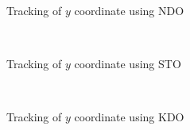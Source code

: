 \documentclass[letterpaper%
, twoside%
, 12pt%
,memoire%
, english%
,creativecommons,hyperref%
]{thETS}
\theoremstyle{newThmStyle}
\begin{document}
\begin{figure}[H]
\centering
{}
\\ \parbox{0.75\textwidth}{\caption{Tracking of $y$ coordinate using NDO}\label{y_trac_dis_m1_ndo}}
\end{figure}

\begin{figure}[H]
\centering
{}
\\ \parbox{0.75\textwidth}{\caption{Tracking of $y$ coordinate using STO}\label{y_trac_dis_m1_sto}}
\end{figure}

\begin{figure}[H]
\centering
{}
\\ \parbox{0.75\textwidth}{\caption{Tracking of $y$ coordinate using KDO}\label{y_trac_dis_m1_kdo}}
\end{figure}
\end{document}
